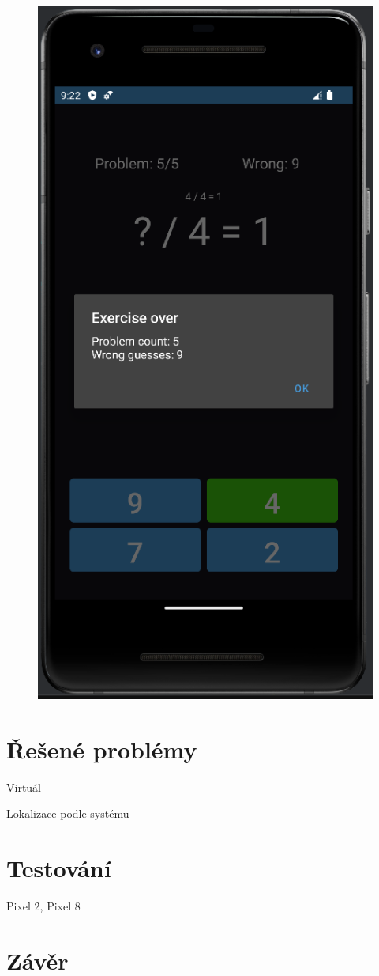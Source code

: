 \documentclass[12pt]{report}
\begin{document}
\begin{figure}[ht]
\begin{minipage}{.5\textwidth}
			\label{fig:dark_1}
		\end{minipage}%
		\hfill
		\begin{minipage}{.5\textwidth}
			\centering
			\includegraphics[height=1.7\textwidth]{img/dark_2}
			\label{fig:dark_2}
		\end{minipage}
	\end{figure}


	\chapter{Řešené problémy}
	Virtuál
	
	Lokalizace podle systému


	\chapter{Testování}
	Pixel 2, Pixel 8
	

	\chapter{Závěr}
	
	
	
\end{document}
